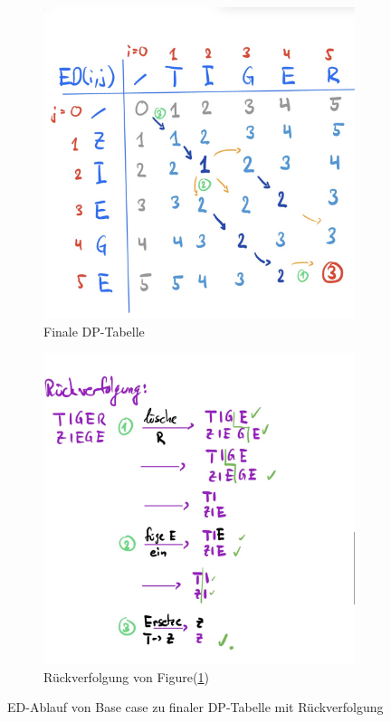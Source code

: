 \documentclass[a4paper]{article}
\begin{document}
\begin{figure}[h]
\begin{subfigure}{0.45\textwidth}
 \includegraphics[width=\textwidth]{Pictures/ED2.jpg}
        \caption{Finale DP-Tabelle}
        \label{fig:ED02}
\end{subfigure}
\begin{subfigure}{0.45\textwidth}
 \includegraphics[width=\textwidth]{Pictures/ED3.jpg}
        \caption{Rückverfolgung von Figure(\ref{fig:ED02})}
        \label{fig:ED03}
\end{subfigure}
\caption{ED-Ablauf von Base case zu finaler DP-Tabelle mit Rückverfolgung}
\label{fig:ED-Ablauf}
\end{figure}
\end{document}
